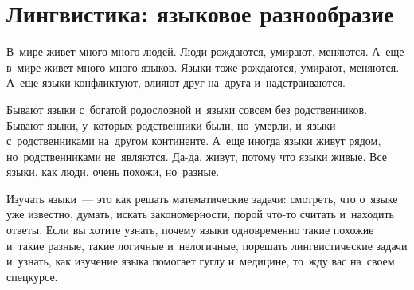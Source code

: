 
\section*{Лингвистика: языковое разнообразие}



В~мире живет много-много людей.
Люди рождаются, умирают, меняются.
А~еще в~мире живет много-много языков.
Языки тоже рождаются, умирают, меняются.
А~еще языки конфликтуют, влияют друг на~друга и~надстраиваются.

Бывают языки с~богатой родословной и~языки совсем без родственников.
Бывают языки, у~которых родственники были, но~умерли, и~языки с~родственниками
на~другом континенте.
А~еще иногда языки живут рядом, но~родственниками не~являются.
Да-да, живут, потому что языки живые.
Все языки, как люди, очень похожи, но~разные.

Изучать языки~--- это как решать математические задачи:
смотреть, что о~языке уже известно, думать, искать закономерности, порой что-то
считать и~находить ответы.
Если вы хотите узнать, почему языки одновременно такие похожие и~такие разные,
такие логичные и~нелогичные, порешать лингвистические задачи и~узнать, как
изучение языка помогает гуглу и~медицине, то~жду вас на~своем спецкурсе.

